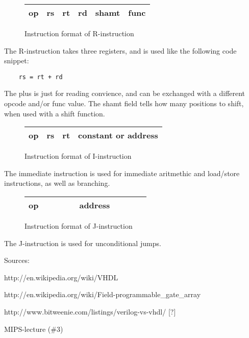 \begin{figure}[ht]
    \centering
    \begin{tabular}{ | c | c | c | c | c | c | }
        \hline
        op & rs & rt & rd & shamt & func \\
        \hline
    \end{tabular}
    \caption{\label{fig:rInstruction}Instruction format of R-instruction}
\end{figure}

The R-instruction takes three registers, and is used like the following code
snippet:

\begin{verbatim}
    rs = rt + rd
\end{verbatim}

The plus is just for reading convience, and can be exchanged with a different
opcode and/or func value. The shamt field tells how many positions to shift,
when used with a shift function.

\begin{figure}[ht]
    \centering
    \begin{tabular}{ | c | c | c |  c  | }
        \hline
        op & rs & rt & constant or address   \\
        \hline
    \end{tabular}
    \caption{\label{fig:iInstruction}Instruction format of I-instruction}
\end{figure}

The immediate instruction is used for immediate aritmethic and load/store
instructions, as well as branching. 


\begin{figure}[ht]
    \centering
    \begin{tabular}{ | c | c c c c c c c c c | }
        \hline
        op & & & & & address & & & &  \\
        \hline
    \end{tabular}
    \caption{\label{fig:jInstruction}Instruction format of J-instruction}
\end{figure}

The J-instruction is used for unconditional jumps.


Sources:

http://en.wikipedia.org/wiki/VHDL

http://en.wikipedia.org/wiki/Field-programmable_gate_array

http://www.bitweenie.com/listings/verilog-vs-vhdl/ [?]

MIPS-lecture (\#3)
